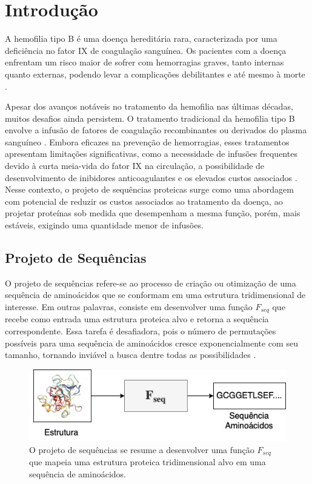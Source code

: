 \chapter{Introdução}
\label{cap:introducao}
\enlargethispage{.5\baselineskip}

A hemofilia tipo B é uma doença hereditária rara, 
caracterizada por uma deficiência no fator IX de coagulação sanguínea. 
Os pacientes com a doença enfrentam um risco maior de sofrer com hemorragias graves, 
tanto internas quanto externas, 
podendo levar a complicações debilitantes e até mesmo à morte \cite{Mannucci}.

Apesar dos avanços notáveis no tratamento da hemofilia nas últimas décadas,
muitos desafios ainda persistem.
O tratamento tradicional da hemofilia tipo B envolve a infusão de fatores de coagulação recombinantes
ou derivados do plasma sanguíneo \cite{Gouw}. 
Embora eficazes na prevenção de hemorragias,
esses tratamentos apresentam limitações significativas,
como a necessidade de infusões frequentes devido à curta meia-vida do fator IX na circulação,
a possibilidade de desenvolvimento de inibidores anticoagulantes e os elevados custos associados \cite{Mancuso}.
Nesse contexto, o projeto de sequências proteicas surge 
como uma abordagem com potencial de reduzir os custos associados ao tratamento da doença, 
ao projetar proteínas sob medida que desempenham a mesma função, porém, mais estáveis, 
exigindo uma quantidade menor de infusões.

\section{Projeto de Sequências}

O projeto de sequências refere-se ao processo de criação ou
otimização de uma sequência de aminoácidos que se conformam em uma estrutura tridimensional de interesse.
Em outras palavras, consiste em desenvolver uma função $F_{seq}$ que 
recebe como entrada uma estrutura proteica alvo e retorna a sequência correspondente. 
Essa tarefa é desafiadora, 
pois o número de permutações possíveis para uma sequência de aminoácidos
cresce exponencialmente com seu tamanho, 
tornando inviável a busca dentre todas as possibilidades \cite{Overview}.

\begin{figure}[H]
  \caption[Projeto de sequências]{O projeto de sequências se resume a desenvolver uma 
  função $F_{seq}$ que mapeia uma estrutura proteica tridimensional alvo em uma sequência de aminoácidos.}
  \centering
  \includegraphics[width=.8\textwidth]{figuras/metodologia-SeqDes.jpg}
\end{figure}

